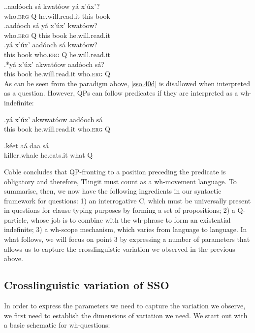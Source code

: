 \documentclass[11pt]{article}
\begin{document}
\ex.\ag.aad\'ooch s\'a kwat\'oow y\'a x'\'ux'?\\
   who.\textsc{erg} Q he.will.read.it this book\\
   \bg.aad\'ooch s\'a y\'a x'\'ux' kwat\'oow?\\
   who.\textsc{erg} Q this book he.will.read.it\\
   \bg.y\'a x'\'ux' aad\'ooch s\'a kwat\'oow?\\
   this book  who.\textsc{erg} Q he.will.read.it\\
   \bg.*\label{sso.40d}y\'a x'\'ux' akwat\'oow aad\'ooch s\'a?\\
   this book he.will.read.it who.\textsc{erg} Q\\

As can be seen from the paradigm above, \ref{sso.40d} is disallowed when interpreted as a question. However, QPs can follow predicates if they are interpreted as a wh-indefinite:

\exg.\label{sso.50}y\'a x'\'ux' akwwat\'oow aad\'ooch s\'a\\
   this book he.will.read.it who.\textsc{erg} Q\\

\exg.\label{sso.60}k\'eet a\'a daa s\'a\\
   killer.whale he.eats.it what Q\\

Cable concludes that QP-fronting to a position preceding the predicate is obligatory and therefore, Tlingit must count as a wh-movement language. To summarise, then, we now have the following ingredients in our syntactic framework for questions: 1) an interrogative C, which must be universally present in questions for clause typing purposes by forming a set of propositions; 2) a Q-particle, whose job is to combine with the wh-phrase to form an existential indefinite; 3) a wh-scope mechanism, which varies from language to language. In what follows, we will focus on point 3 by expressing a number of parameters that allows us to capture the crosslinguistic variation we observed in the previous above.

\subsection{Crosslinguistic variation of SSO}
In order to express the parameters we need to capture the variation we observe, we first need to establish the dimensions of variation we need. We start out with a basic schematic for wh-questions:
\end{document}
